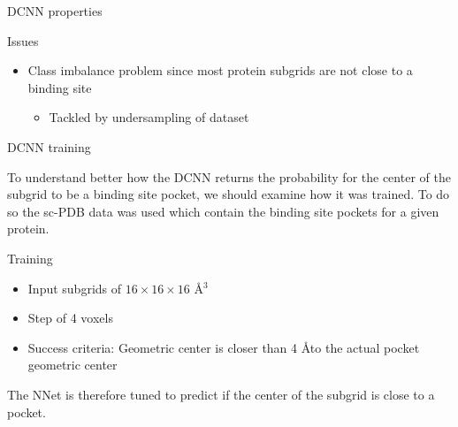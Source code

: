 \documentclass{beamer}
\begin{document}
\begin{frame}{DCNN properties}
  \begin{block}{Issues}
    \begin{itemize}
      \item Class imbalance problem since most protein subgrids are not close to a binding site
      \begin{itemize}
        \item Tackled by undersampling of dataset
      \end{itemize}
    \end{itemize}
  \end{block}
\end{frame}

\begin{frame}{DCNN training}
  \begin{block}{}
    To understand better how the DCNN returns the probability for the center of the subgrid to be a binding site pocket, we should examine how it was trained.
    To do so the sc-PDB data was used which contain the binding site pockets for a given protein.
  \end{block}
  \begin{block}{Training}
    \begin{itemize}
      \item Input subgrids of $16 \times 16 \times 16$ \AA$^3$
      \item Step of 4 voxels
      \item Success criteria: Geometric center is closer than 4 \AA\;to the actual pocket geometric center
    \end{itemize}
  \end{block}
  \begin{block}{}
    The NNet is therefore tuned to predict if the center of the subgrid is close to a pocket.
  \end{block}
\end{frame}
\end{document}
